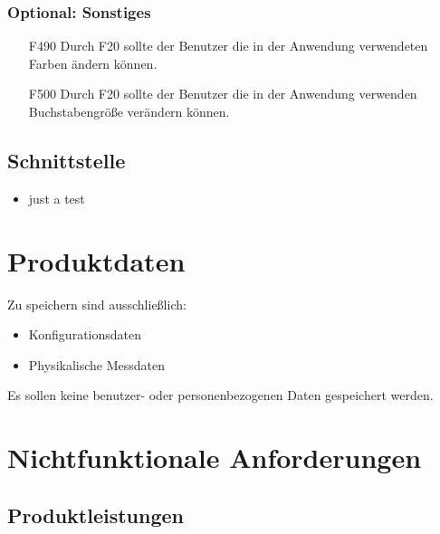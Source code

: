 \documentclass[parskip=full]{scrartcl}
\begin{document}
\subsubsection{Optional: Sonstiges}

\begin{itemize}

\item[F490] Durch F20 sollte der Benutzer die in der Anwendung verwendeten Farben ändern können.
\item[F500] Durch F20 sollte der Benutzer die in der Anwendung verwenden Buchstabengröße verändern können.

\end{itemize}

\subsection{Schnittstelle}

\begin{itemize}
\item just a test

\end{itemize}

\section{Produktdaten}

Zu speichern sind ausschließlich:

\begin{itemize}

\item Konfigurationsdaten
\item Physikalische Messdaten

\end{itemize}

Es sollen keine benutzer- oder personenbezogenen Daten gespeichert werden.

\section{Nichtfunktionale Anforderungen}

\subsection{Produktleistungen}
\end{document}
